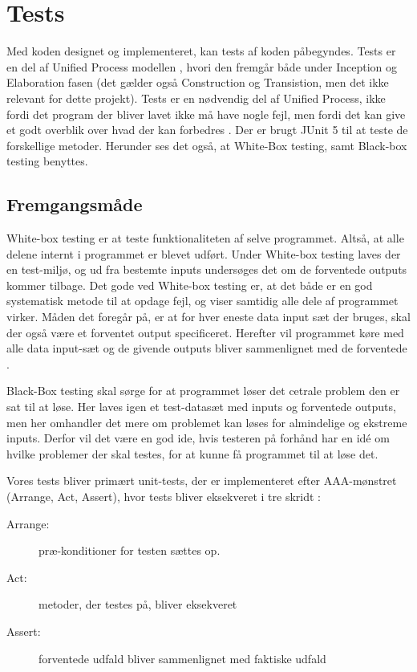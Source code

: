 \chapter{Tests}\label{ch:tests}
Med koden designet og implementeret, kan tests af koden påbegyndes. Tests er en del af Unified Process modellen \cite{UnifiedProcess}, hvori den fremgår både under Inception og Elaboration fasen (det gælder også Construction og Transistion, men det ikke relevant for dette projekt). Tests er en nødvendig del af Unified Process, ikke fordi det program der bliver lavet ikke må have nogle fejl, men fordi det kan give et godt overblik over hvad der kan forbedres \cite{sestoft2008systematic}. Der er brugt JUnit 5\cite{JUnit} til at teste de forskellige metoder. Herunder ses det også, at White-Box testing, samt Black-box testing benyttes. 

\section{Fremgangsmåde}
White-box testing er at teste funktionaliteten af selve programmet. Altså, at alle delene internt i programmet er blevet udført. Under White-box testing laves der en test-miljø, og ud fra bestemte inputs undersøges det om de forventede outputs kommer tilbage. Det gode ved White-box testing er, at det både er en god systematisk metode til at opdage fejl, og viser samtidig alle dele af programmet virker. Måden det foregår på, er at for hver eneste data input sæt der bruges, skal der også være et forventet output specificeret. Herefter vil programmet køre med alle data input-sæt og de givende outputs bliver sammenlignet med de forventede \cite{sestoft2008systematic}.

Black-Box testing skal sørge for at programmet løser det cetrale problem den er sat til at løse. Her laves igen et test-datasæt med inputs og forventede outputs, men her omhandler det mere om problemet kan løses for almindelige og ekstreme inputs. Derfor vil det være en god ide, hvis testeren på forhånd har en idé om hvilke problemer der skal testes, for at kunne få programmet til at løse det\cite{sestoft2008systematic}. 

Vores tests bliver primært unit-tests, der er implementeret efter AAA-mønstret (Arrange, Act, Assert), hvor tests bliver eksekveret i tre skridt \cite{ArrangeActAssert}:
\begin{description}
    \item[Arrange:] præ-konditioner for testen sættes op.
    \item[Act:] metoder, der testes på, bliver eksekveret
    \item[Assert:] forventede udfald bliver sammenlignet med faktiske udfald 
\end{description}

